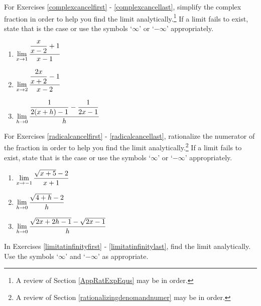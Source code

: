 For Exercises \ref{complexcancelfirst} - \ref{complexcancellast}, simplify the complex fraction in order to help you find the limit analytically.\footnote{A review of Section \ref{AppRatExpEqus} may be in order.}  If a limit fails to exist, state that is the case  or use the symbols `$\infty$' or `$-\infty$' appropriately.

\begin{multicols}{3}
\begin{enumerate}
\setcounter{enumi}{\value{HW}}

\item\label{complexcancelfirst}  $\displaystyle{\lim_{x \rightarrow 1} \dfrac{\dfrac{x}{x-2} +1}{x-1}}$

\item $\displaystyle{ \lim_{x \rightarrow 2} \dfrac{\dfrac{2x}{x+2}  -1}{x-2} }$ 
     
\item\label{complexcancellast} $\displaystyle{ \lim_{h \rightarrow 0} \dfrac{\dfrac{1}{2(x+h) - 1}  - \dfrac{1}{2x-1} }{h} }$ 

\setcounter{HW}{\value{enumi}}
\end{enumerate}
\end{multicols}

For Exercises \ref{radicalcancelfirst} - \ref{radicalcancellast}, rationalize the numerator of the fraction in order to help you find the limit analytically.\footnote{A review of Section \ref{rationalizingdenomandnumer} may be in order.} If a limit fails to exist, state that is the case  or use the symbols `$\infty$' or `$-\infty$' appropriately.


\begin{multicols}{3}
\begin{enumerate}
\setcounter{enumi}{\value{HW}}

 \item\label{radicalcancelfirst}  $\displaystyle{ \lim_{x \rightarrow -1} \dfrac{\sqrt{x+5} - 2 }{x+1} }$  
   
 \item   $\displaystyle{\lim_{h \rightarrow 0} \dfrac{\sqrt{4+h} - 2}{h}}$

\item\label{radicalcancellast} $\displaystyle{ \lim_{h \rightarrow 0} \dfrac{\sqrt{2x+2h-1} - \sqrt{2x-1} }{h} }$  

\setcounter{HW}{\value{enumi}}
\end{enumerate}
\end{multicols}


 In Exercises \ref{limitatinfinityfirst} - \ref{limitatinfinitylast},  find the limit analytically.  Use the symbols `$\infty$' and `$-\infty$' as appropriate.

